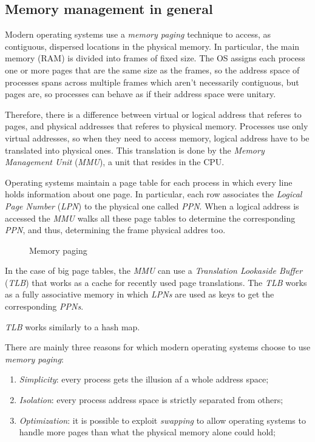 \subsection{Memory management in general}
Modern operating systems use a \emph{memory paging} technique to access, as
contiguous, dispersed locations in the physical memory. In particular, the main
memory (RAM) is divided into frames of fixed size. The OS assigns each process
one or more pages that are the same size as the frames, so the address space of
processes spans across multiple frames which aren't necessarily contiguous, but
pages are, so processes can behave as if their address space were unitary.

Therefore, there is a difference between virtual or logical address that referes
to pages, and physical addresses that referes to physical memory. Processes
use only virtual addresses, so when they need to access memory, logical address
have to be translated into physical ones. This translation is done by the
\emph{Memory Management Unit} (\emph{MMU}), a unit that resides in the CPU.

Operating systems maintain a page table for each process in which every line
holds information about one page. In particular, each row associates the
\emph{Logical Page Number} (\emph{LPN}) to the physical one called \emph{PPN}.
When a logical address is accessed the \emph{MMU} walks all these page tables
to determine the corresponding \emph{PPN}, and thus, determining the frame physical
addres too.

\begin{figure}[h!]
    \centering
    \caption{Memory paging}
\end{figure}

\noindent
In the case of big page tables, the \emph{MMU} can use a \emph{Translation
Lookaside Buffer} (\emph{TLB}) that works as a cache for recently used page
translations. The \emph{TLB} works as a fully associative memory in which
\emph{LPNs} are used as keys to get the corresponding \emph{PPNs}.
\begin{note}
    \emph{TLB} works similarly to a hash map.
\end{note}

\noindent
There are mainly three reasons for which modern operating systems choose to use
\emph{memory paging}:
\begin{enumerate}
    \item \emph{Simplicity}: every process gets the illusion af a whole address
    space;
    \item \emph{Isolation}: every process address space is strictly separated
    from others;
    \item \emph{Optimization}: it is possible to exploit \emph{swapping} to allow
    operating systems to handle more pages than what the physical memory alone
    could hold;
\end{enumerate}

